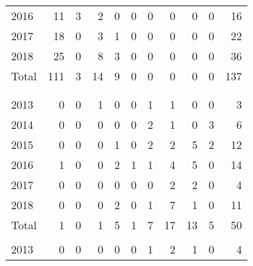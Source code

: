 \documentclass[a4paper]{article}
\begin{document}
\begin{table}
{\begin{tabular}[t]{lrrrrrrrrrr}
\hspace{1em}\hspace{1em}2016 & 11 & 3 & 2 & 0 & 0 & 0 & 0 & 0 & 0 & 16\\
\hspace{1em}\hspace{1em}2017 & 18 & 0 & 3 & 1 & 0 & 0 & 0 & 0 & 0 & 22\\
\hspace{1em}\hspace{1em}2018 & 25 & 0 & 8 & 3 & 0 & 0 & 0 & 0 & 0 & 36\\
\hspace{1em}\hspace{1em}Total & 111 & 3 & 14 & 9 & 0 & 0 & 0 & 0 & 0 & 137\\
\addlinespace[0.3em]
\multicolumn{11}{l}{\textbf{Withdrawal}}\\
\addlinespace[0.3em]
\multicolumn{11}{l}{\textbf{Female}}\\
\hspace{1em}\hspace{1em}2013 & 0 & 0 & 1 & 0 & 0 & 1 & 1 & 0 & 0 & 3\\
\hspace{1em}\hspace{1em}2014 & 0 & 0 & 0 & 0 & 0 & 2 & 1 & 0 & 3 & 6\\
\hspace{1em}\hspace{1em}2015 & 0 & 0 & 0 & 1 & 0 & 2 & 2 & 5 & 2 & 12\\
\hspace{1em}\hspace{1em}2016 & 1 & 0 & 0 & 2 & 1 & 1 & 4 & 5 & 0 & 14\\
\hspace{1em}\hspace{1em}2017 & 0 & 0 & 0 & 0 & 0 & 0 & 2 & 2 & 0 & 4\\
\hspace{1em}\hspace{1em}2018 & 0 & 0 & 0 & 2 & 0 & 1 & 7 & 1 & 0 & 11\\
\hspace{1em}\hspace{1em}Total & 1 & 0 & 1 & 5 & 1 & 7 & 17 & 13 & 5 & 50\\
\addlinespace[0.3em]
\multicolumn{11}{l}{\textbf{Male}}\\
\hspace{1em}\hspace{1em}2013 & 0 & 0 & 0 & 0 & 0 & 1 & 2 & 1 & 0 & 4\\

\end{tabular}}
\end{table}
\end{document}
